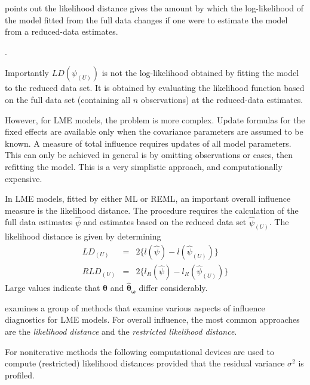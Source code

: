 \documentclass[12pt, a4paper]{report}
\theoremstyle{plain}
\theoremstyle{definition}
\theoremstyle{remark}
\begin{document}
	\citet{schabenberger} points out the likelihood distance gives the amount by which the log-likelihood of the model fitted from the full data changes if one were
	to estimate the model from a reduced-data estimates.
	
. 
	
	
	
	Importantly $LD(\psi_{(U)})$ is not the log-likelihood obtained by fitting the model to the reduced data set. It is obtained by evaluating the likelihood function based on the full data set (containing all $n$ observations) at the reduced-data estimates.
	
	
	However, for LME models, the problem is more complex. Update formulas for the fixed effects are available only when the covariance parameters are assumed to be known. A measure of total influence requires updates of all model parameters. This can only be achieved in general is by omitting observations or cases, then refitting the model. This is a very simplistic approach, and computationally expensive.
	

In LME models, fitted by either ML or REML, an important overall
influence measure is the likelihood distance. The
procedure requires the calculation of the full data estimates
$\hat{\psi}$ and estimates based on the reduced data set
$\hat{\psi}_{(U)}$. The likelihood distance is given by
determining
\begin{eqnarray}
LD_{(U)} &=& 2\{l(\hat{\psi}) - l( \hat{\psi}_{(U)}) \}\\
RLD_{(U)} &=& 2\{l_{R}(\hat{\psi}) - l_{R}(\hat{\psi}_{(U)})\}
\end{eqnarray}
Large values indicate that $\boldsymbol{\hat{\theta}}$ and $\boldsymbol{\hat{\theta}_\omega}$ differ considerably.
	
	\citet{west} examines a group of methods that examine various aspects of influence diagnostics for LME models.
	For overall influence, the most common approaches are the \textit{likelihood distance} and the \textit{restricted likelihood distance}.

For noniterative methods the following computational devices are used to compute (restricted) likelihood distances provided that the residual variance
	$\sigma^2$ is profiled.
	
\end{document}
